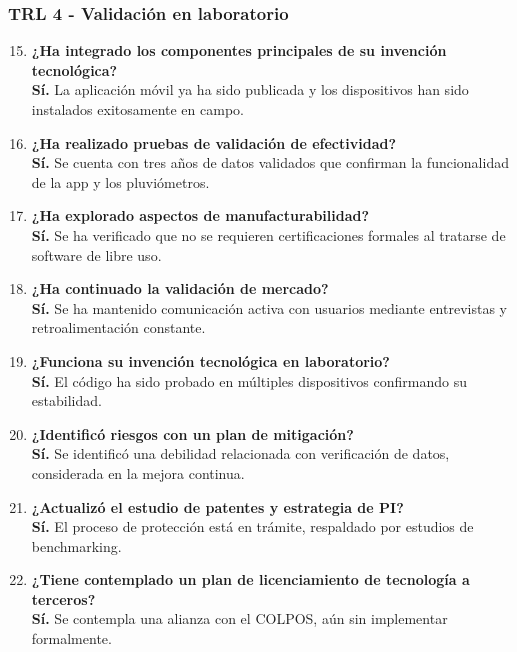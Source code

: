 \subsubsection*{TRL 4 - Validación en laboratorio}
\begin{enumerate}
    \setcounter{enumi}{14}
    \item \textbf{¿Ha integrado los componentes principales de su invención tecnológica?} \\ \textbf{Sí.} La aplicación móvil ya ha sido publicada y los dispositivos han sido instalados exitosamente en campo.
    
    \item \textbf{¿Ha realizado pruebas de validación de efectividad?} \\ \textbf{Sí.} Se cuenta con tres años de datos validados que confirman la funcionalidad de la app y los pluviómetros.
    
    \item \textbf{¿Ha explorado aspectos de manufacturabilidad?} \\ \textbf{Sí.} Se ha verificado que no se requieren certificaciones formales al tratarse de software de libre uso.
    
    \item \textbf{¿Ha continuado la validación de mercado?} \\ \textbf{Sí.} Se ha mantenido comunicación activa con usuarios mediante entrevistas y retroalimentación constante.
    
    \item \textbf{¿Funciona su invención tecnológica en laboratorio?} \\ \textbf{Sí.} El código ha sido probado en múltiples dispositivos confirmando su estabilidad.
    
    \item \textbf{¿Identificó riesgos con un plan de mitigación?} \\ \textbf{Sí.} Se identificó una debilidad relacionada con verificación de datos, considerada en la mejora continua.
    
    \item \textbf{¿Actualizó el estudio de patentes y estrategia de PI?} \\ \textbf{Sí.} El proceso de protección está en trámite, respaldado por estudios de benchmarking.
    
    \item \textbf{¿Tiene contemplado un plan de licenciamiento de tecnología a terceros?} \\ \textbf{Sí.} Se contempla una alianza con el COLPOS, aún sin implementar formalmente.
\end{enumerate}

